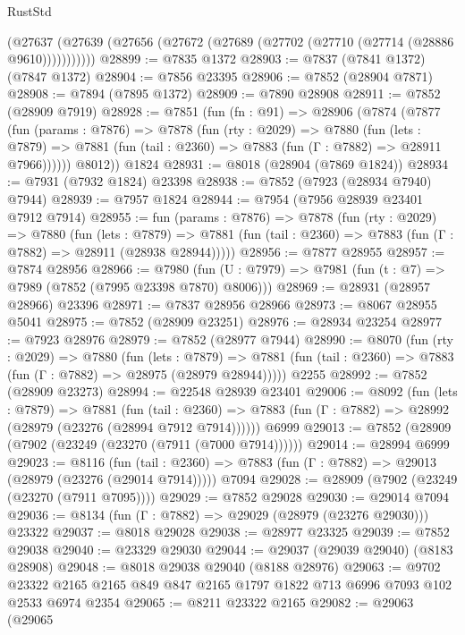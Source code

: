 \begin{lexlean}{RustStd}
\begin{coremodule}
        (@27637 (@27639 (@27656 (@27672 (@27689 (@27702 (@27710 (@27714 (@28886 @9610)))))))))))
@28899 := @7835 @1372
@28903 := @7837 (@7841 @1372) (@7847 @1372)
@28904 := @7856 @23395
@28906 := @7852 (@28904 @7871)
@28908 := @7894 (@7895 @1372)
@28909 := @7890 @28908
@28911 := @7852 (@28909 @7919)
@28928 := @7851
    (fun (fn : @91) =>
    @28906
      (@7874
        (@7877
          (fun (params : @7876) =>
          @7878
            (fun (rty : @2029) =>
            @7880
              (fun (lets : @7879) =>
              @7881 (fun (tail : @2360) => @7883 (fun (Γ : @7882) => @28911 @7966))))))
        @8012))
    @1824
@28931 := @8018 (@28904 (@7869 @1824))
@28934 := @7931 (@7932 @1824) @23398
@28938 := @7852 (@7923 (@28934 @7940) @7944)
@28939 := @7957 @1824
@28944 := @7954 (@7956 @28939 @23401 @7912 @7914)
@28955 := fun (params : @7876) =>
  @7878
    (fun (rty : @2029) =>
    @7880
      (fun (lets : @7879) =>
      @7881 (fun (tail : @2360) => @7883 (fun (Γ : @7882) => @28911 (@28938 @28944)))))
@28956 := @7877 @28955
@28957 := @7874 @28956
@28966 := @7980
    (fun (U : @7979) => @7981 (fun (t : @7) => @7989 (@7852 (@7995 @23398 @7870) @8006)))
@28969 := @28931 (@28957 @28966) @23396
@28971 := @7837 @28956 @28966
@28973 := @8067 @28955 @5041
@28975 := @7852 (@28909 @23251)
@28976 := @28934 @23254
@28977 := @7923 @28976
@28979 := @7852 (@28977 @7944)
@28990 := @8070
    (fun (rty : @2029) =>
    @7880
      (fun (lets : @7879) =>
      @7881 (fun (tail : @2360) => @7883 (fun (Γ : @7882) => @28975 (@28979 @28944)))))
    @2255
@28992 := @7852 (@28909 @23273)
@28994 := @22548 @28939 @23401
@29006 := @8092
    (fun (lets : @7879) =>
    @7881
      (fun (tail : @2360) =>
      @7883 (fun (Γ : @7882) => @28992 (@28979 (@23276 (@28994 @7912 @7914))))))
    @6999
@29013 := @7852 (@28909 (@7902 (@23249 (@23270 (@7911 (@7000 @7914))))))
@29014 := @28994 @6999
@29023 := @8116
    (fun (tail : @2360) => @7883 (fun (Γ : @7882) => @29013 (@28979 (@23276 (@29014 @7914)))))
    @7094
@29028 := @28909 (@7902 (@23249 (@23270 (@7911 @7095))))
@29029 := @7852 @29028
@29030 := @29014 @7094
@29036 := @8134 (fun (Γ : @7882) => @29029 (@28979 (@23276 @29030))) @23322
@29037 := @8018 @29028
@29038 := @28977 @23325
@29039 := @7852 @29038
@29040 := @23329 @29030
@29044 := @29037 (@29039 @29040) (@8183 @28908)
@29048 := @8018 @29038 @29040 (@8188 @28976)
@29063 := @9702
    @23322
    @2165
    @2165
    @849
    @847
    @2165
    @1797
    @1822
    @713
    @6996
    @7093
    @102
    @2533
    @6974
    @2354
@29065 := @8211 @23322 @2165
@29082 := @29063
    (@29065

\end{coremodule}
\end{lexlean}
